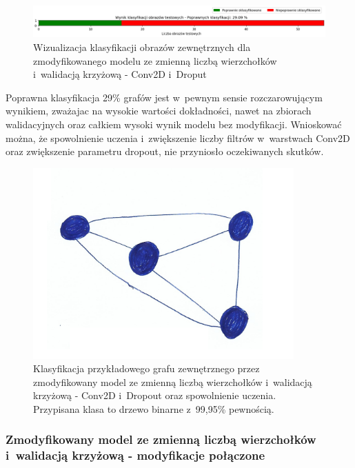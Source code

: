\begin{figure}[ht]
	\centering
	\includegraphics[width=14cm]{resources/tests/images/v4/multiple_edges_crossvalid_1_bar.png}
	\caption{Wizualizacja klasyfikacji obrazów zewnętrznych dla zmodyfikowanego modelu ze zmienną liczbą wierzchołków i~walidacją krzyżową - Conv2D i~Droput}
	\label{Fig:tests-csvar-1c}
\end{figure}
\FloatBarrier

Poprawna klasyfikacja 29\% grafów jest w~pewnym sensie rozczarowującym wynikiem,
zważajac na wysokie wartości dokładności, nawet na zbiorach walidacyjnych
oraz całkiem wysoki wynik modelu bez modyfikacji.
Wnioskować można, że spowolnienie uczenia i~zwiększenie liczby filtrów w~warstwach Conv2D oraz zwiększenie parametru dropout,
nie przyniosło oczekiwanych skutków.

\begin{figure}[ht]
	\centering
	\includegraphics[width=10cm]{../graph_classification/test_graphs/drawn/full-10.png}
	\caption{Klasyfikacja przykładowego grafu zewnętrznego przez
		zmodyfikowany model ze zmienną liczbą wierzchołków i~walidacją krzyżową - Conv2D i~Dropout oraz spowolnienie uczenia.
		Przypisana klasa to drzewo binarne z~99,95\% pewnością.}
	\label{Fig:tests-cv-1d}
\end{figure}
\FloatBarrier

\subsubsection{Zmodyfikowany model ze zmienną liczbą wierzchołków i~walidacją krzyżową - modyfikacje połączone}


